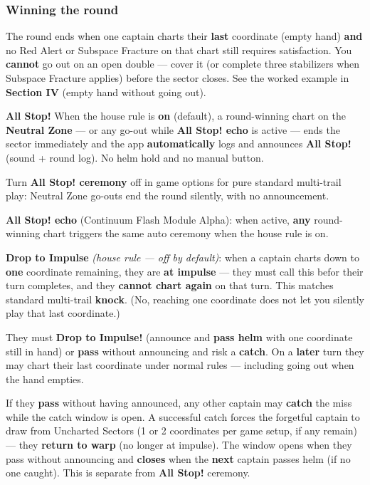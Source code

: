 \documentclass[11pt]{article}
\begin{document}
\subsubsection{Winning the round}\label{winning-the-round}

The round ends when one captain charts their \textbf{last} coordinate
(empty hand) \textbf{and} no Red Alert or Subspace Fracture on that
chart still requires satisfaction. You \textbf{cannot} go out on an open
double --- cover it (or complete three stabilizers when Subspace
Fracture applies) before the sector closes. See the worked example in
\textbf{Section IV} (empty hand without going out).

\textbf{All Stop!} When the house rule is \textbf{on} (default), a
round-winning chart on the \textbf{Neutral Zone} --- or any go-out while
\textbf{All Stop! echo} is active --- ends the sector immediately and
the app \textbf{automatically} logs and announces \textbf{All Stop!}
(sound + round log). No helm hold and no manual button.

Turn \textbf{All Stop! ceremony} off in game options for pure standard
multi-trail play: Neutral Zone go-outs end the round silently, with no
announcement.

\textbf{All Stop! echo} (Continuum Flash Module Alpha): when active,
\textbf{any} round-winning chart triggers the same auto ceremony when
the house rule is on.

\textbf{Drop to Impulse} \emph{(house rule --- off by default)}: when a
captain charts down to \textbf{one} coordinate remaining, they are
\textbf{at impulse} --- they must call this befor their turn completes,
and they \textbf{cannot chart again} on that turn. This matches standard
multi-trail \textbf{knock}. (No, reaching one coordinate does not let you
silently play that last coordinate.)

They must \textbf{Drop to Impulse!} (announce and \textbf{pass helm}
with one coordinate still in hand) or \textbf{pass} without announcing and
risk a \textbf{catch}. On a \textbf{later} turn they may chart their
last coordinate under normal rules --- including going out when the hand
empties.

If they \textbf{pass} without having announced, any other captain may
\textbf{catch} the miss while the catch window is open. A successful
catch forces the forgetful captain to draw from Uncharted Sectors (1 or
2 coordinates per game setup, if any remain) --- they \textbf{return to warp}
(no longer at impulse). The window opens when they pass without
announcing and \textbf{closes} when the \textbf{next} captain passes
helm (if no one caught). This is separate from \textbf{All Stop!}
ceremony.
\end{document}
